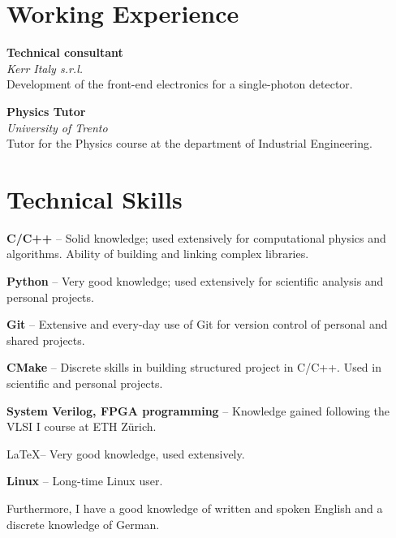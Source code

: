 \documentclass[a4paper,10pt]{article}
\begin{document}
\begin{adjustbox}{valign=t}
\begin{minipage}{0.6\textwidth} %

\section*{Working Experience}
\begin{description}
\raggedright
\item[\normalfont \textcolor{ColorTwo}{Jul. 2021 -- Dec. 2021.}] 
	\textbf{Technical consultant}\\
	
	\emph{Kerr Italy s.r.l.}\\
	\small
	Development of the front-end electronics for a single-photon detector.
	\normalsize
\item[\normalfont \textcolor{ColorTwo}{Feb. 2021 -- Jun. 2021}] 
	\textbf{Physics Tutor}\\
	
	\emph{University of Trento}\\
	\small 
	Tutor for the Physics course at the department of Industrial Engineering.
    \normalsize
\end{description}
\section*{Technical Skills}
\begin{description}
\item \textbf{C/C++} -- \small  Solid knowledge; used extensively for computational physics and algorithms. Ability of building and linking complex libraries. \normalsize
\item \textbf{Python} -- \small Very good knowledge; used extensively for scientific analysis and personal projects.\normalsize
\item \textbf{Git} -- \small Extensive and every-day use of Git for version control of personal and shared projects.\normalsize
\item \textbf{CMake} -- \small Discrete skills in building structured project in C/C++. Used in scientific and personal projects.\normalsize
\item \textbf{System Verilog, FPGA programming} -- \small Knowledge gained following the VLSI I course at ETH Zürich.\normalsize
\item \LaTeX -- \small Very good knowledge, used extensively.\normalsize
\item \textbf{Linux} -- \small Long-time Linux user.\normalsize
\end{description}
\small 
Furthermore, I have a good knowledge of written and spoken English and a discrete knowledge of German.
\normalsize

\end{minipage}
\end{adjustbox}
\end{document}
